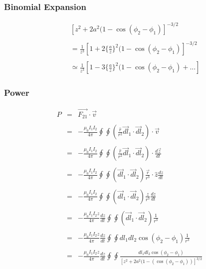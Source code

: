 \documentclass[12pt]{revtex4}
\begin{document}
\subsubsection{Binomial Expansion}\label{bin}

\begin{eqnarray*}
&&[z^{2}+2a^{2}(1-\cos(\phi_{2}-\phi_{1})]^{-3/2} \\ \\
&&=\frac{1}{z^{3}}[1+2\big\{ \frac{a}{z}\big\}^{2}(1-\cos(\phi_{2}-\phi_{1})]^{-3/2} \\ \\
&&\simeq \frac{1}{z^{3}}[1-3\big\{ \frac{a}{z}\big\}^{2}(1-\cos(\phi_{2}-\phi_{1})+...] 
\end{eqnarray*}

\subsubsection{Power}

\begin{eqnarray*}
P&=&\vec{F_{21}} \cdot \vec{v}\\ \\
&=&- \frac{\mu_{0} I_{1}I_{2}}{4\pi} \oint \oint (\frac{\hat{r}}{r^{2}}  \vec{dl}_{1} \cdot \vec{dl}_{2}) \cdot  \vec{v}\\ \\
&=&- \frac{\mu_{0} I_{1}I_{2}}{4\pi} \oint \oint (\frac{\hat{r}}{r^{2}}  \vec{dl}_{1} \cdot \vec{dl}_{2}) \cdot  \frac{d\vec{z}}{dt}\\ \\
&=&- \frac{\mu_{0} I_{1}I_{2}}{4\pi} \oint \oint ( \vec{dl}_{1} \cdot \vec{dl}_{2}) \frac{\vec{r}}{r^{3}} \cdot  \hat{z}\frac{dz}{dt}\\ \\
&=&- \frac{\mu_{0} I_{1}I_{2}}{4\pi} \oint \oint ( \vec{dl}_{1} \cdot \vec{dl}_{2}) \frac{z}{r^{3}} \frac{dz}{dt}\\ \\
&=&- \frac{\mu_{0} I_{1}I_{2}z}{4\pi} \frac{dz}{dt} \oint \oint ( \vec{dl}_{1} \cdot \vec{dl}_{2}) \frac{1}{r^{3}} \\ \\
&=&- \frac{\mu_{0} I_{1}I_{2}z}{4\pi} \frac{dz}{dt} \oint \oint {dl}_{1} {dl}_{2}\cos(\phi_{2}-\phi_{1}) \frac{1}{r^{3}} \\ \\
&=&- \frac{\mu_{0} I_{1}I_{2}z}{4\pi} \frac{dz}{dt} \oint  \oint \frac{{dl}_{1} {dl}_{2}\cos(\phi_{2}-\phi_{1})} {[z^{2}+2a^{2}(1-(\cos(\phi_{2}-\phi_{1}))]^{3/2}} \\ \\
\end{eqnarray*}
\end{document}
